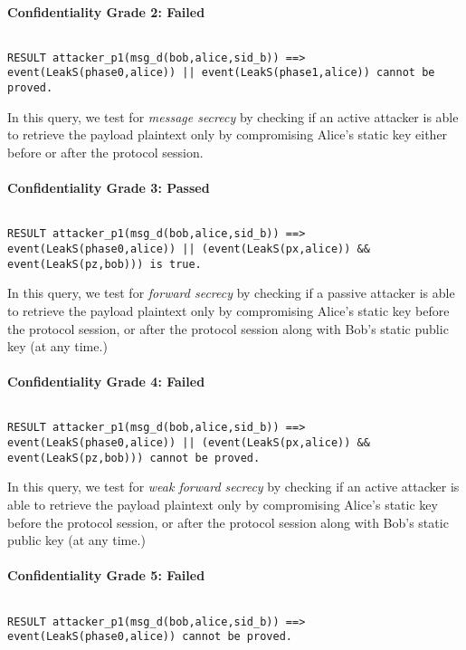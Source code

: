 \paragraph{Confidentiality Grade 2: Failed}$ $
\begin{lstlisting}
RESULT attacker_p1(msg_d(bob,alice,sid_b)) ==> event(LeakS(phase0,alice)) || event(LeakS(phase1,alice)) cannot be proved.
\end{lstlisting}

In this query, we test for \emph{message secrecy} by checking if an active attacker is able to retrieve the payload plaintext only by compromising Alice's static key either before or after the protocol session.


\paragraph{Confidentiality Grade 3: Passed}$ $
\begin{lstlisting}
RESULT attacker_p1(msg_d(bob,alice,sid_b)) ==> event(LeakS(phase0,alice)) || (event(LeakS(px,alice)) && event(LeakS(pz,bob))) is true.
\end{lstlisting}

In this query, we test for \emph{forward secrecy} by checking if a passive attacker is able to retrieve the payload plaintext only by compromising Alice's static key before the protocol session, or after the protocol session along with Bob's static public key (at any time.)


\paragraph{Confidentiality Grade 4: Failed}$ $
\begin{lstlisting}
RESULT attacker_p1(msg_d(bob,alice,sid_b)) ==> event(LeakS(phase0,alice)) || (event(LeakS(px,alice)) && event(LeakS(pz,bob))) cannot be proved.
\end{lstlisting}

In this query, we test for \emph{weak forward secrecy} by checking if an active attacker is able to retrieve the payload plaintext only by compromising Alice's static key before the protocol session, or after the protocol session along with Bob's static public key (at any time.)


\paragraph{Confidentiality Grade 5: Failed}$ $
\begin{lstlisting}
RESULT attacker_p1(msg_d(bob,alice,sid_b)) ==> event(LeakS(phase0,alice)) cannot be proved.
\end{lstlisting}

